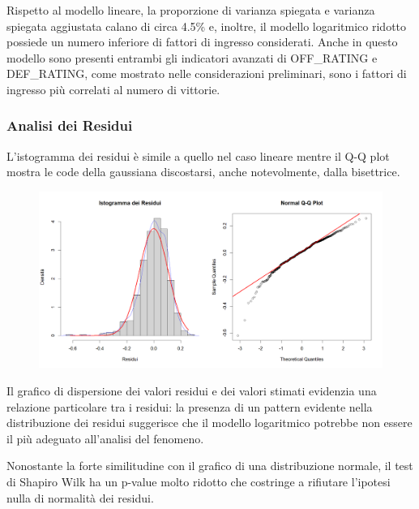 \documentclass[11pt,a4paper]{article}
\begin{document}
Rispetto al modello lineare, la proporzione di varianza spiegata e varianza spiegata aggiustata calano di circa 4.5\% e, inoltre, il modello logaritmico ridotto possiede un numero inferiore di fattori di ingresso considerati. Anche in questo modello sono presenti entrambi gli indicatori avanzati di OFF\_RATING e DEF\_RATING, come mostrato nelle considerazioni preliminari, sono i fattori di ingresso più correlati al numero di vittorie.

\subsubsection{Analisi dei Residui}
 L'istogramma dei residui è simile a quello nel caso lineare mentre il Q-Q plot mostra le code della gaussiana discostarsi, anche notevolmente, dalla bisettrice.

\begin{figure}[h]
    \hspace{-1.5cm}
	\includegraphics[scale=0.55]{imgs/residuals_analysis_log_model.png}
    \end{figure}
\vspace{-0.4cm}

Il grafico di dispersione dei valori residui e dei valori stimati evidenzia una relazione particolare tra i residui: la presenza di un pattern evidente nella distribuzione dei residui suggerisce che il modello logaritmico potrebbe non essere il più adeguato all'analisi del fenomeno.

Nonostante la forte similitudine con il grafico di una distribuzione normale, il test di Shapiro Wilk ha un p-value molto ridotto che costringe a rifiutare l'ipotesi nulla di normalità dei residui.
\end{document}
